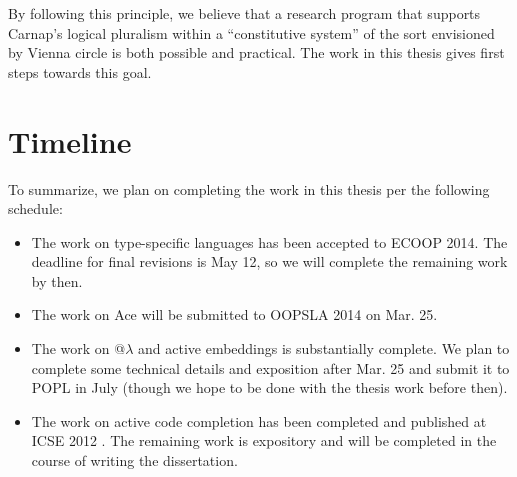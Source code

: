 By following this principle, we believe that a research program that supports Carnap's logical pluralism within a ``constitutive system'' of the sort envisioned by Vienna circle is both possible and practical. The work in this thesis gives first steps towards this goal.


\section{Timeline}
To summarize, we plan on completing the work in this thesis per the following schedule:
\begin{itemize}
\item The work on type-specific languages has been accepted to ECOOP 2014. The deadline for final revisions is May 12, so we will complete the remaining work by then.
\item The work on Ace will be submitted to OOPSLA 2014 on Mar. 25.
\item The work on @$\lambda$ and active embeddings is substantially complete. We plan to complete some technical details and exposition after Mar. 25 and submit it to POPL in July (though we hope to be done with the thesis work before then).
\item The work on active code completion has been completed and published at ICSE 2012 \cite{Omar:2012:ACC:2337223.2337324}. The remaining work is expository and will be completed in the course of writing the dissertation.
\end{itemize}
